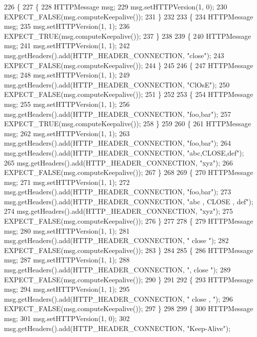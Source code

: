 \begin{DoxyCode}
226                                       \{
227   \{
228     HTTPMessage msg;
229     msg.setHTTPVersion(1, 0);
230     EXPECT\_FALSE(msg.computeKeepalive());
231   \}
232 
233   \{
234     HTTPMessage msg;
235     msg.setHTTPVersion(1, 1);
236     EXPECT\_TRUE(msg.computeKeepalive());
237   \}
238 
239   \{
240     HTTPMessage msg;
241     msg.setHTTPVersion(1, 1);
242     msg.getHeaders().add(HTTP\_HEADER\_CONNECTION, \textcolor{stringliteral}{"close"});
243     EXPECT\_FALSE(msg.computeKeepalive());
244   \}
245 
246   \{
247     HTTPMessage msg;
248     msg.setHTTPVersion(1, 1);
249     msg.getHeaders().add(HTTP\_HEADER\_CONNECTION, \textcolor{stringliteral}{"ClOsE"});
250     EXPECT\_FALSE(msg.computeKeepalive());
251   \}
252 
253   \{
254     HTTPMessage msg;
255     msg.setHTTPVersion(1, 1);
256     msg.getHeaders().add(HTTP\_HEADER\_CONNECTION, \textcolor{stringliteral}{"foo,bar"});
257     EXPECT\_TRUE(msg.computeKeepalive());
258   \}
259 
260   \{
261     HTTPMessage msg;
262     msg.setHTTPVersion(1, 1);
263     msg.getHeaders().add(HTTP\_HEADER\_CONNECTION, \textcolor{stringliteral}{"foo,bar"});
264     msg.getHeaders().add(HTTP\_HEADER\_CONNECTION, \textcolor{stringliteral}{"abc,CLOSE,def"});
265     msg.getHeaders().add(HTTP\_HEADER\_CONNECTION, \textcolor{stringliteral}{"xyz"});
266     EXPECT\_FALSE(msg.computeKeepalive());
267   \}
268 
269   \{
270     HTTPMessage msg;
271     msg.setHTTPVersion(1, 1);
272     msg.getHeaders().add(HTTP\_HEADER\_CONNECTION, \textcolor{stringliteral}{"foo,bar"});
273     msg.getHeaders().add(HTTP\_HEADER\_CONNECTION, \textcolor{stringliteral}{"abc ,  CLOSE , def"});
274     msg.getHeaders().add(HTTP\_HEADER\_CONNECTION, \textcolor{stringliteral}{"xyz"});
275     EXPECT\_FALSE(msg.computeKeepalive());
276   \}
277 
278   \{
279     HTTPMessage msg;
280     msg.setHTTPVersion(1, 1);
281     msg.getHeaders().add(HTTP\_HEADER\_CONNECTION, \textcolor{stringliteral}{"  close "});
282     EXPECT\_FALSE(msg.computeKeepalive());
283   \}
284 
285   \{
286     HTTPMessage msg;
287     msg.setHTTPVersion(1, 1);
288     msg.getHeaders().add(HTTP\_HEADER\_CONNECTION, \textcolor{stringliteral}{",  close "});
289     EXPECT\_FALSE(msg.computeKeepalive());
290   \}
291 
292   \{
293     HTTPMessage msg;
294     msg.setHTTPVersion(1, 1);
295     msg.getHeaders().add(HTTP\_HEADER\_CONNECTION, \textcolor{stringliteral}{"  close , "});
296     EXPECT\_FALSE(msg.computeKeepalive());
297   \}
298 
299   \{
300     HTTPMessage msg;
301     msg.setHTTPVersion(1, 0);
302     msg.getHeaders().add(HTTP\_HEADER\_CONNECTION, \textcolor{stringliteral}{"Keep-Alive"});

\end{DoxyCode}
